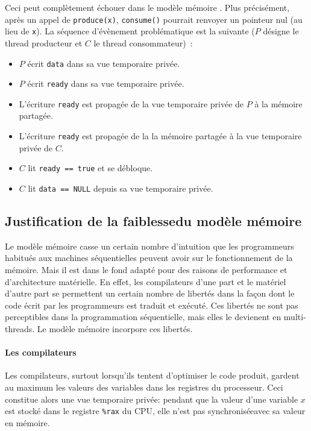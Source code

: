 Ceci peut complètement échouer dans le modèle mémoire \OMP. Plus
précisément, après un appel de \texttt{produce(x)}, \texttt{consume()}
pourrait renvoyer un pointeur nul (au lieu de \texttt{x}). La séquence
d'évènement problématique est la suivante ($P$ désigne le thread
producteur et $C$ le thread consommateur)~:
\begin{itemize}
\item $P$ écrit \texttt{data} dans sa vue temporaire privée.
\item $P$ écrit \texttt{ready} dans sa vue temporaire privée.
\item L'écriture \texttt{ready} est propagée de la vue temporaire privée de $P$ à la mémoire partagée.
\item L'écriture \texttt{ready} est propagée de la la mémoire partagée à la vue temporaire privée de $C$.
\item $C$ lit \texttt{ready == true} et se débloque.
\item $C$ lit \texttt{data == NULL} depuis sa vue temporaire privée.
\end{itemize}


\subsection{Justification de la \og faiblesse\fg du modèle mémoire}

Le modèle mémoire \OMP casse un certain nombre d'intuition que les programmeurs
habitués aux machines séquentielles peuvent avoir sur le fonctionnement de la
mémoire. Mais il est dans le fond adapté pour des raisons de performance et
d'architecture matérielle. En effet, les compilateurs d'une part et le matériel
d'autre part se permettent un certain nombre de libertés dans la façon dont le
code écrit par les programmeurs est traduit et exécuté. Ces libertés ne sont pas
perceptibles dans la programmation séquentielle, mais elles le devienent en
multi-threads. Le modèle mémoire \OMP incorpore ces libertés.

\paragraph{Les compilateurs} Les compilateurs, surtout lorsqu'ils tentent
d'optimiser le code produit, gardent au maximum les valeurs des variables dans
les registres du processeur. Ceci constitue alors une \og vue temporaire
privée\fg : pendant que la valeur d'une variable $x$ est stocké dans le registre
\texttt{\%rax} du CPU, elle n'est pas \og synchronisée\fg avec sa valeur en
mémoire.

